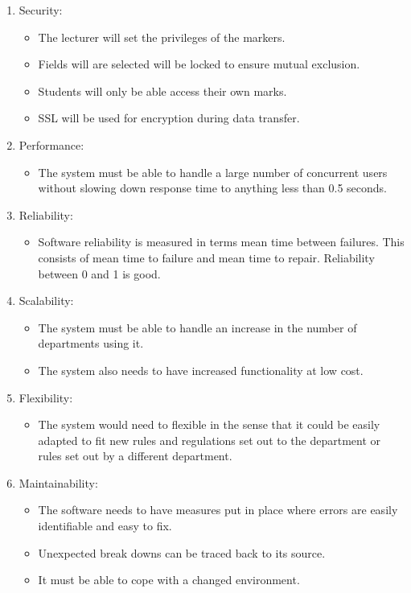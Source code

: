 \begin{enumerate}

\item Security:
\begin{itemize}
\item The lecturer will set the privileges of the markers.
\item Fields will are selected will be locked to ensure mutual exclusion.
\item Students will only be able access their own marks.
\item SSL will be used for encryption during data transfer.
\end{itemize}
\item Performance:
\begin{itemize}
\item The system must be able to handle a large number of concurrent users without slowing down response time to anything less than 0.5 seconds.
\end{itemize}
\item Reliability:
\begin{itemize}
\item Software reliability is measured in terms mean time between failures. This consists of mean time to failure and mean time to repair. Reliability between 0 and 1 is good.
\end{itemize}
\item Scalability:
\begin{itemize}
\item The system must be able to handle an increase in the number of departments using it.
\item The system also needs to have increased functionality at low cost.
\end{itemize}
\item Flexibility:
\begin{itemize}
\item The system would need to flexible in the sense that it could be easily adapted to fit new rules and regulations set out to the department or rules set out by a different department.
\end{itemize}
\item Maintainability:
\begin{itemize}
\item The software needs to have measures put in place where errors are easily identifiable and easy to fix. 
\item Unexpected break downs can be traced back to its source.
\item It must be able to cope with a changed environment.

\end{itemize}
\end{enumerate}
